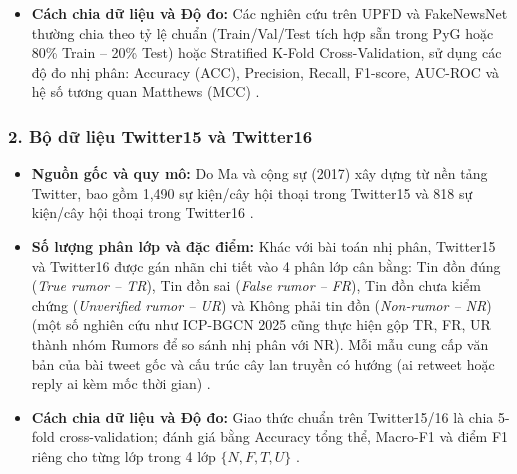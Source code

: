 \documentclass[11pt,a4paper]{extreport}
\begin{document}
\begin{itemize}
\begin{itemize}
    \end{itemize}
    \item \textbf{Cách chia dữ liệu và Độ đo:} Các nghiên cứu trên UPFD và FakeNewsNet thường chia theo tỷ lệ chuẩn (Train/Val/Test tích hợp sẵn trong PyG hoặc 80\% Train -- 20\% Test) hoặc Stratified K-Fold Cross-Validation, sử dụng các độ đo nhị phân: Accuracy (ACC), Precision, Recall, F1-score, AUC-ROC và hệ số tương quan Matthews (MCC) \cite{noauthor_ensemble_2024, noauthor_comparative_2024, noauthor_co-attention_2025}.
\end{itemize}

\subsubsection{2. Bộ dữ liệu Twitter15 và Twitter16}
\begin{itemize}
    \item \textbf{Nguồn gốc và quy mô:} Do Ma và cộng sự (2017) \cite{ma_detect_2017} xây dựng từ nền tảng Twitter, bao gồm 1,490 sự kiện/cây hội thoại trong Twitter15 và 818 sự kiện/cây hội thoại trong Twitter16 \cite{noauthor_disinformation_2024, ma_detect_2017}.
    \item \textbf{Số lượng phân lớp và đặc điểm:} Khác với bài toán nhị phân, Twitter15 và Twitter16 được gán nhãn chi tiết vào 4 phân lớp cân bằng: Tin đồn đúng (\textit{True rumor -- TR}), Tin đồn sai (\textit{False rumor -- FR}), Tin đồn chưa kiểm chứng (\textit{Unverified rumor -- UR}) và Không phải tin đồn (\textit{Non-rumor -- NR}) (một số nghiên cứu như ICP-BGCN 2025 \cite{noauthor_integrating_2025} cũng thực hiện gộp TR, FR, UR thành nhóm Rumors để so sánh nhị phân với NR). Mỗi mẫu cung cấp văn bản của bài tweet gốc và cấu trúc cây lan truyền có hướng (ai retweet hoặc reply ai kèm mốc thời gian) \cite{noauthor_early_2025, noauthor_integrating_2025}.
    \item \textbf{Cách chia dữ liệu và Độ đo:} Giao thức chuẩn trên Twitter15/16 là chia 5-fold cross-validation; đánh giá bằng Accuracy tổng thể, Macro-F1 và điểm F1 riêng cho từng lớp trong 4 lớp $\{N, F, T, U\}$ \cite{noauthor_early_2025, noauthor_integrating_2025, noauthor_beyond_2023}.
\end{itemize}
\end{document}
